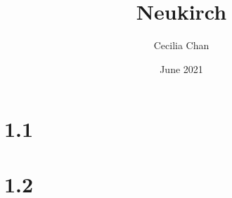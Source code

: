 \documentclass{article}
\title{Neukirch}
\author{Cecilia Chan}
\date{June 2021}
\begin{document}
\maketitle

\section{1.1}


\section{1.2}

\end{document}
